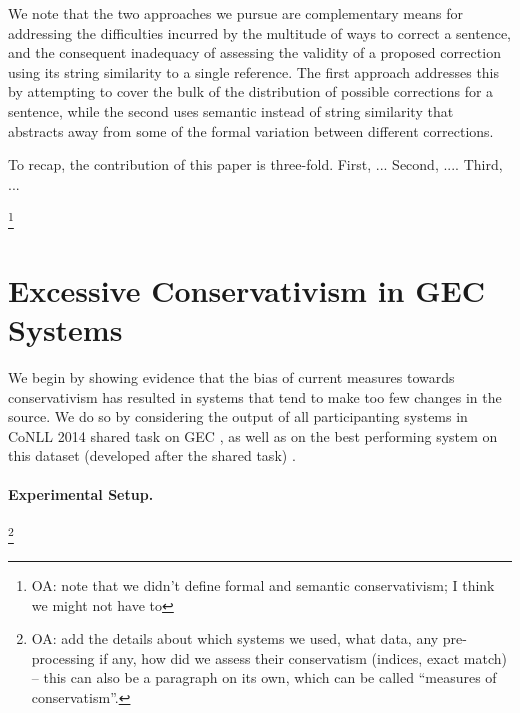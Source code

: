 \documentclass[english]{article}
\newcommand{\oa}[1]{\footnote{\color{red}OA: #1}}
\begin{document}
We note that the two approaches we pursue are complementary means for addressing the difficulties
incurred by the multitude of ways to correct a sentence, and the consequent inadequacy of assessing
the validity of a proposed correction using its string similarity to a single reference.
The first approach addresses this by attempting to cover the bulk of the distribution of possible
corrections for a sentence, while the second uses semantic instead of string similarity that abstracts
away from some of the formal variation between different corrections.

To recap, the contribution of this paper is three-fold.
First, ...
Second, ....
Third, ...

\oa{note that we didn't define formal and semantic conservativism; I think we might not have to}

\section{Excessive Conservativism in GEC Systems}\label{sec:formal_conservatism}




We begin by showing evidence that the bias of current measures towards conservativism
has resulted in systems that tend to make too few changes in the source. 
We do so by considering the output of all participanting systems in CoNLL
2014 shared task on GEC \cite{ng2014conll}, as well as on the
best performing system on this dataset (developed after the shared task) \cite{rozovskaya2014building}. 

\paragraph{Experimental Setup.}\oa{add the details about which systems we used, what data,
  any pre-processing if any, how did we assess their conservatism (indices, exact match) -- this can also be a paragraph
  on its own, which can be called ``measures of conservatism''.}
\end{document}
